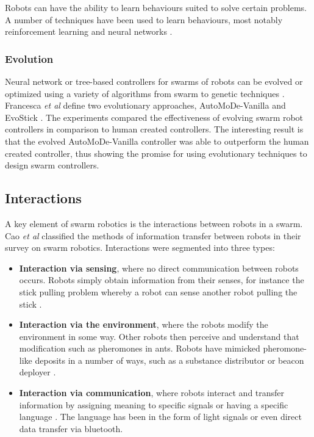 Robots can have the ability to learn behaviours suited to solve certain problems. A number of techniques have been used to learn behaviours, most notably reinforcement learning and neural networks \cite{samejima1999adaptive, sun1999multi}.

\subsubsection{Evolution}
Neural network or tree-based controllers for swarms of robots can be evolved or optimized using a variety of algorithms from swarm to genetic techniques \cite{baldassarre2003evolving, tuci2014evolutionary}. Francesca \textit{et al} define two evolutionary approaches, AutoMoDe-Vanilla and EvoStick \cite{francesca2014automode,francesca2014experiment}. The experiments compared the effectiveness of evolving swarm robot controllers in comparison to human created controllers. The interesting result is that the evolved AutoMoDe-Vanilla controller was able to outperform the human created controller, thus showing the promise for using evolutionary techniques to design swarm controllers.

\subsection{Interactions}
A key element of swarm robotics is the interactions between robots in a swarm. Cao \textit{et al} \cite{cao1997cooperative} classified the methods of information transfer between robots in their  survey on swarm robotics. Interactions were segmented into three types:
\begin{itemize}
	\item \textbf{Interaction via sensing}, where no direct communication between robots occurs. Robots simply obtain information from their senses, for instance the stick pulling problem whereby a robot can sense another robot pulling the stick \cite{ijspeert2001collaboration}. 
	\item \textbf{Interaction via the environment}, where the robots modify the environment in some way. Other robots then perceive and understand that modification such as pheromones in ants. Robots have mimicked pheromone-like deposits in a number of ways, such as a substance distributor \cite{fujisawa2014designing} or beacon deployer \cite{barth2003dynamic}.
	\item \textbf{Interaction via communication}, where robots interact and transfer information by assigning meaning to specific signals or having a specific language \cite{hoff2010two}. The language has been in the form of light signals or even direct data transfer via bluetooth.  
\end{itemize}

